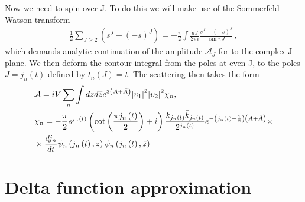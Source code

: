 \documentclass[12pt,a4paper]{article}
\begin{document}
Now we need to spin over J. To do this we will make use of the Sommerfeld-Watson transform
\begin{align}
    \frac{1}{2} \sum_{J \geq 2} \left( s^J + {(- s)}^J \right)= - \frac{\pi}{2} \int \frac{dJ}{2 \pi i} \frac{s^J + {(- s)}^J}{\sin \pi J}\,,
\end{align}
which demands analytic continuation of the amplitude $\mathcal{A}_J$ for to the complex J-plane. We then deform the contour integral from the poles at even J, to the poles $J = j_n (t)$ defined by $t_n(J) = t$. The scattering then takes the form
\begin{align}
& \mathcal{A} = i V \sum_n \int dz d\bar{z} e^{3\left(A + \bar{A}\right)} {\left| \upsilon_1 \right|}^2 {\left| \upsilon_2 \right|}^2 \chi_n, \\ \notag
& \chi_n = - \frac{\pi}{2} s^{j_n \left(t\right)} \left( \cot\left(\frac{\pi j_n \left(t\right)}{2}\right) + i\right) \frac{k_{j_n \left(t\right)}\bar{k}_{j_n \left(t\right)}}{2^{j_n \left(t\right)}} e^{-\left( j_n \left(t\right) - \frac{1}{2} \right)\left(A+\bar{A}\right)} \times \\
& \times \frac{d j_n}{d t} \psi_n \left(j_n \left(t\right), z \right)  \psi_n \left(j_n \left(t\right), \bar{z} \right)
\end{align}

\section{Delta function approximation}

\end{document}
